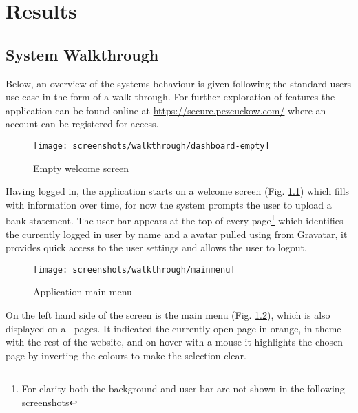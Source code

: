 \begin{comment}
Chapter 5: Results
Results that illustrate how the system designed by you works in practice, and how it is intended to be used, may be presented in this chapter. Screen shots may be useful to illustrate how the software interacts with the user.
\end{comment}

\chapter[Results]{Results}
\label{cha:results}

\section{System Walkthrough}
Below, an overview of the systems behaviour is given following the standard users use case in the form of a walk through. For further exploration of features the application can be found online at \url{https://secure.pezcuckow.com/} where an account can be registered for access.

\begin{figure}
\centering
\texttt{[image: screenshots/walkthrough/dashboard-empty]}
\caption{Empty welcome screen}
\label{fig:welcomescreen}
\end{figure}

Having logged in, the application starts on a welcome screen (Fig. \ref{fig:welcomescreen}) which fills with information over time, for now the system prompts the user to upload a bank statement. The user bar appears at the top of every page\footnote{For clarity both the background and user bar are not shown in the following screenshots} which identifies the currently logged in user by name and a avatar pulled using from Gravatar\parencite{gravatar2014avatars}, it provides quick access to the user settings and allows the user to logout.

\begin{figure}
\centering
\texttt{[image: screenshots/walkthrough/mainmenu]}
\caption{Application main menu}
\label{fig:mainmenu}
\end{figure}

On the left hand side of the screen is the main menu (Fig. \ref{fig:mainmenu}), which is also displayed on all pages. It indicated the currently open page in orange, in theme with the rest of the website, and on hover with a mouse it highlights the chosen page by inverting the colours to make the selection clear.

